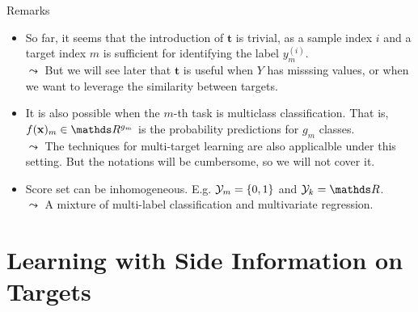 \documentclass[11pt,compress,t,notes=noshow, xcolor=table]{beamer}
\newcommand{\tv}{\mathbf{t}}
\newcommand{\yim}{y^{(i)}_m}
\begin{document}
\begin{frame}{Remarks}

		\begin{itemize}\small
			\item So far, it seems that the introduction of $\tv$ is trivial, as a sample index $i$ and a target index $m$ is sufficient for identifying the label $\yim$. \\ 
            \vspace{10pt} 
            $\leadsto$ But we will see later that $\tv$ is useful when $Y$ has misssing values, or when we want to leverage the similarity between targets.
            \vspace{20pt}

            \item It is also possible when the $m$-th task is multiclass classification. That is, $f(\xv)_m \in \R^{g_m}$ is the probability predictions for $g_m$ classes. \\
            \vspace{10pt}
            $\leadsto$ The techniques for multi-target learning are also applicalble under this setting. But the notations will be cumbersome, so we will not cover it.
            \vspace{20pt}

            \item Score set can be inhomogeneous. E.g. $\mathcal{Y}_m = \{0, 1\}$ and $\Yspace_k = \R$. \\
            \vspace{10pt}
            $\leadsto$ A mixture of multi-label classification and multivariate regression.
            
		\end{itemize}


\end{frame}


\section{Learning with Side Information on Targets}
\end{document}
